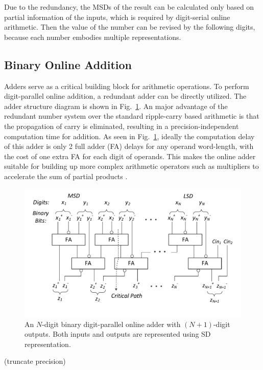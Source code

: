 \documentclass[conference]{IEEEtran}
\begin{document}
Due to the redundancy, the MSDs of the result can be calculated only based on partial information of the inputs, which is required by digit-serial online arithmetic. Then the value of the number can be revised by the following digits, because each number embodies multiple representations.

\subsection{Binary Online Addition}
Adders serve as a critical building block for arithmetic operations. To perform digit-parallel online addition, a redundant adder can be directly utilized. The adder structure diagram is shown in Fig.~\ref{Fig:Radix2SD_adder}. An major advantage of the redundant number system over the standard ripple-carry based arithmetic is that the propagation of carry is eliminated, resulting in a precision-independent computation time for addition. As seen in Fig.~\ref{Fig:Radix2SD_adder}, ideally the computation delay of this adder is only 2 full adder (FA) delays for any operand word-length, with the cost of one extra FA for each digit of operands. This makes the online adder suitable for building up more complex arithmetic operators such as multipliers to accelerate the sum of partial products \cite{RedundantMult_1987}.

\begin{figure}[htbp]
	\centering
	\includegraphics[width=.5\textwidth]{./Figures/SDAdder.pdf}
    \vspace{-5ex}
	\caption{An $N$-digit binary digit-parallel online adder with $(N+1)$-digit outputs. Both inputs and outputs are represented using SD representation.}
    \vspace{2ex}
	\label{Fig:Radix2SD_adder}
\end{figure}

(truncate precision)

\end{document}
